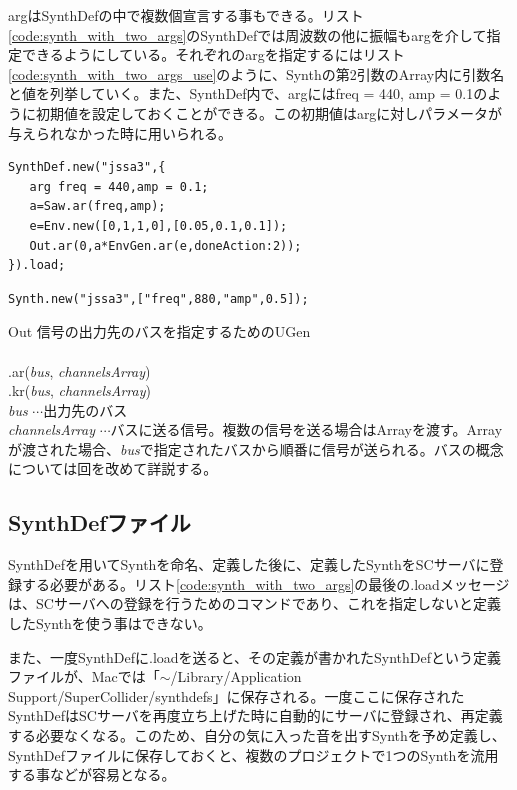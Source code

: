 \documentclass{jsarticle}
\begin{document}
argはSynthDefの中で複数個宣言する事もできる。リスト\ref{code:synth_with_two_args}のSynthDefでは周波数の他に振幅もargを介して指定できるようにしている。それぞれのargを指定するにはリスト\ref{code:synth_with_two_args_use}のように、Synthの第2引数のArray内に引数名と値を列挙していく。また、SynthDef内で、argにはfreq = 440, amp = 0.1のように初期値を設定しておくことができる。この初期値はargに対しパラメータが与えられなかった時に用いられる。

\begin{lstlisting}[caption=SynthDefの使用法,label=code:synth_with_two_args]
SynthDef.new("jssa3",{
   arg freq = 440,amp = 0.1;
   a=Saw.ar(freq,amp);
   e=Env.new([0,1,1,0],[0.05,0.1,0.1]);
   Out.ar(0,a*EnvGen.ar(e,doneAction:2));
}).load;
\end{lstlisting}
\begin{lstlisting}[caption=argの指定,label=code:synth_with_two_args_use]
Synth.new("jssa3",["freq",880,"amp",0.5]);
\end{lstlisting}

\begin{itembox}[l]{Out}
{\footnotesize 
信号の出力先のバスを指定するためのUGen\\\\
.ar({\it bus}, {\it channelsArray})\\
.kr({\it bus}, {\it channelsArray})\\

{\it bus} $\cdots$出力先のバス\\
{\it channelsArray} $\cdots$バスに送る信号。複数の信号を送る場合はArrayを渡す。Arrayが渡された場合、{\it bus}で指定されたバスから順番に信号が送られる。バスの概念については回を改めて詳説する。
}
\end{itembox}

\subsection{SynthDefファイル}
SynthDefを用いてSynthを命名、定義した後に、定義したSynthをSCサーバに登録する必要がある。リスト\ref{code:synth_with_two_args}の最後の.loadメッセージは、SCサーバへの登録を行うためのコマンドであり、これを指定しないと定義したSynthを使う事はできない。

また、一度SynthDefに.loadを送ると、その定義が書かれたSynthDefという定義ファイルが、Macでは「$\sim$/Library/Application Support/SuperCollider/synthdefs」に保存される。一度ここに保存されたSynthDefはSCサーバを再度立ち上げた時に自動的にサーバに登録され、再定義する必要なくなる。このため、自分の気に入った音を出すSynthを予め定義し、SynthDefファイルに保存しておくと、複数のプロジェクトで1つのSynthを流用する事などが容易となる。
\end{document}
